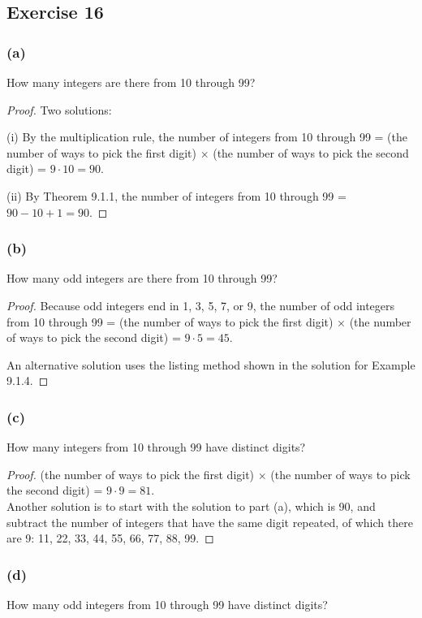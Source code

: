 \documentclass[14pt]{extarticle}
\begin{document}
\subsection{Exercise 16}
\subsubsection{(a)}
How many integers are there from 10 through 99?

\begin{proof}
Two solutions:

(i) By the multiplication rule, the number of integers from 10 through 99 = (the number of ways to pick the first 
digit) \(\times\) (the number of ways to pick the second digit) = \(9 \cdot 10 = 90\).

(ii) By Theorem 9.1.1, the number of integers from 10 through 99 = \(90 - 10 + 1 = 90\).
\end{proof}

\subsubsection{(b)}
How many odd integers are there from 10 through 99?

\begin{proof}
Because odd integers end in 1, 3, 5, 7, or 9, the number of odd integers from 10 through 99 = (the number of ways to 
pick the first digit) \(\times\) (the number of ways to pick the second digit) = \(9 \cdot 5 = 45\).

An alternative solution uses the listing method shown in the solution for Example 9.1.4.
\end{proof}

\subsubsection{(c)}
How many integers from 10 through 99 have distinct digits?

\begin{proof}
(the number of ways to pick the first digit) \(\times\) (the number of ways to pick the second digit) = 
\(9 \cdot 9 = 81\). \\
Another solution is to start with the solution to part (a), which is 90, and subtract the number of integers that have 
the same digit repeated, of which there are 9: 11, 22, 33, 44, 55, 66, 77, 88, 99.
\end{proof}

\subsubsection{(d)}
How many odd integers from 10 through 99 have distinct digits?
\end{document}
